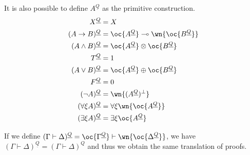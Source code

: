 It is also possible to define \(A^{\underline{Q}}\) as the primitive construction.
\begin{align*}
X^{\underline{Q}} & = X \\
(A\imp B)^{\underline{Q}} & = \oc{A^{\underline{Q}}}\limp\wn{\oc{B^{\underline{Q}}}} \\
(A\wedge B)^{\underline{Q}} & = \oc{A^{\underline{Q}}}\tens\oc{B^{\underline{Q}}} \\
T^{\underline{Q}} & = \one \\
(A\vee B)^{\underline{Q}} & = \oc{A^{\underline{Q}}}\plus\oc{B^{\underline{Q}}} \\
F^{\underline{Q}} & = \zero \\
(\neg A)^{\underline{Q}} & = \wn{(A^{\underline{Q}})\orth} \\
(\forall\xi A)^{\underline{Q}} & = \forall\xi \wn{\oc{A^{\underline{Q}}}} \\
(\exists\xi A)^{\underline{Q}} & = \exists\xi \oc{A^{\underline{Q}}}
\end{align*}

If we define
\((\Gamma\vdash\Delta)^{\underline{Q}} = \oc{\Gamma^{\underline{Q}}}\vdash\wn{\oc{\Delta^{\underline{Q}}}}\),
we have
\((\Gamma\vdash\Delta)^{\underline{Q}} = (\Gamma\vdash\Delta)^Q\) and
thus we obtain the same translation of proofs.


